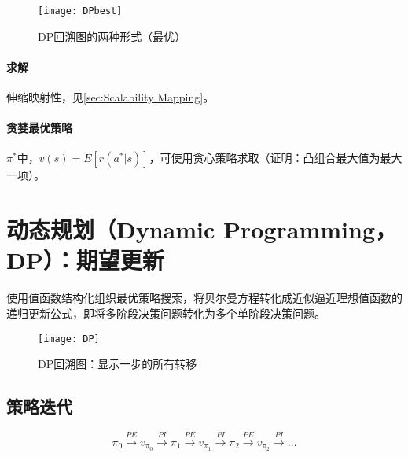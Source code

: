 \documentclass[
12pt, %
a4paper, 
oneside, %
headinclude,footinclude, %
]{scrartcl}
\begin{document}
\begin{figure}[H]
\centering 
\texttt{[image: DPbest]} 
\caption{DP回溯图的两种形式（最优）}
\end{figure}
\paragraph{求解}\label{sec:Scalability Mapping back}
伸缩映射性，见\ref{sec:Scalability Mapping}。
\paragraph{贪婪最优策略}
$ \pi^* $中，$ v(s) = E[r(a^*|s)] $，可使用贪心策略求取（证明：凸组合最大值为最大一项）。
\section[动态规划]{动态规划（Dynamic Programming，DP）：期望更新}
\begin{minipage}{0.55\textwidth}
\hspace{2em}
使用值函数结构化组织最优策略搜索，将贝尔曼方程转化成近似逼近理想值函数的递归更新公式，即将多阶段决策问题转化为多个单阶段决策问题。
\end{minipage}
\begin{minipage}{0.45\textwidth}
\begin{figure}[H]
\centering 
\texttt{[image: DP]} 
\caption{DP回溯图：显示一步的所有转移}
\end{figure}
\end{minipage}
\subsection[策略迭代]{策略迭代}
$$ \pi_0 \xrightarrow{PE} v_{\pi_0} \xrightarrow{PI} \pi_1 \xrightarrow{PE} v_{\pi_1} \xrightarrow{PI} \pi_2 \xrightarrow{PE} v_{\pi_2} \xrightarrow{PI} \dots $$
\end{document}
